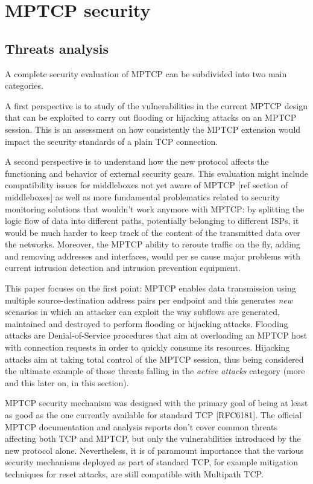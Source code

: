 \chapter{MPTCP security}
\label{chap:mptcpsecurity}

\section{Threats analysis}
A complete security evaluation of MPTCP can be subdivided into two main categories. 


A first perspective is to study of the vulnerabilities in the current MPTCP design that can be exploited to carry out flooding or hijacking attacks on an MPTCP session. This is an assessment on how consistently the MPTCP extension would impact the security standards of a plain TCP connection.


A second perspective is to understand how the new protocol affects the functioning and behavior of external security gears. This evaluation might include compatibility issues for middleboxes not yet aware of MPTCP [ref section of middleboxes] as well as more fundamental problematics related to security monitoring solutions that wouldn't work anymore with MPTCP: by splitting the logic flow of data into different paths, potentially belonging to different ISPs, it would be much harder to keep track of the content of the transmitted data over the networks. Moreover, the MPTCP ability to reroute traffic on the fly, adding and removing addresses and interfaces, would per se cause major problems with current intrusion detection and intrusion prevention equipment.


This paper focuses on the first point: MPTCP enables data transmission using multiple source-destination address pairs per endpoint and this generates \textit{new} scenarios in which an attacker can exploit the way subflows are generated, maintained and destroyed to perform flooding or hijacking attacks. 
Flooding attacks are Denial-of-Service procedures that aim at overloading an MPTCP host with connection requests in order to quickly consume its resources.
Hijacking attacks aim at taking total control of the MPTCP session, thus being considered the ultimate example of those threats falling in the \textit{active attacks} category (more and this later on, in this section).


MPTCP security mechanism was designed with the primary goal of being at least as good as the one currently available for standard TCP [RFC6181]. The official MPTCP documentation and analysis reports don't cover common threats affecting both TCP and MPTCP, but only the vulnerabilities introduced by the new protocol alone. Nevertheless, it is of paramount importance that the various security mechanisms deployed as part of standard TCP, for example mitigation techniques for reset attacks, are still compatible with Multipath TCP.

